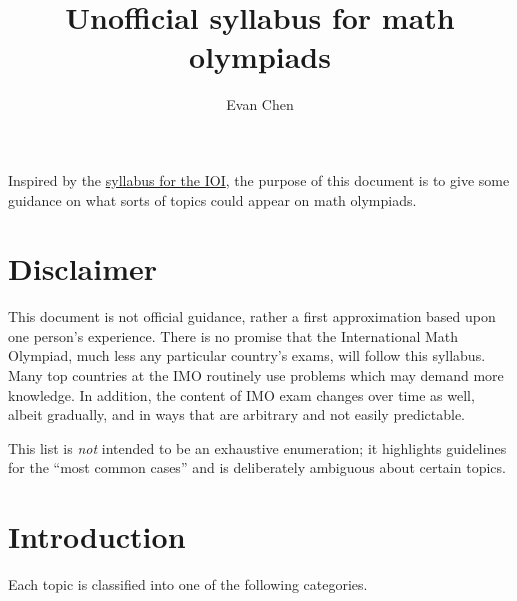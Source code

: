 \documentclass[11pt]{scrartcl}
\begin{document}
\title{Unofficial syllabus for math olympiads}
\author{Evan Chen}
\maketitle

Inspired by the \href{https://ioinformatics.org/files/ioi-syllabus-2019.pdf}
{syllabus for the IOI},
the purpose of this document is to give some guidance
on what sorts of topics could appear on math olympiads.

\section{Disclaimer}
\alert{This document is not official guidance},
rather a first approximation based upon one person's experience.
There is no promise that the International Math Olympiad,
much less any particular country's exams,
will follow this syllabus.
Many top countries at the IMO routinely use problems
which may demand more knowledge.
In addition, the content of IMO exam changes over time as well,
albeit gradually, and in ways that are arbitrary and not easily predictable.

This list is \emph{not} intended to be an exhaustive enumeration;
it highlights guidelines for the ``most common cases''
and is deliberately ambiguous about certain topics.

\section{Introduction}
Each topic is classified into one of the following categories.
\end{document}

